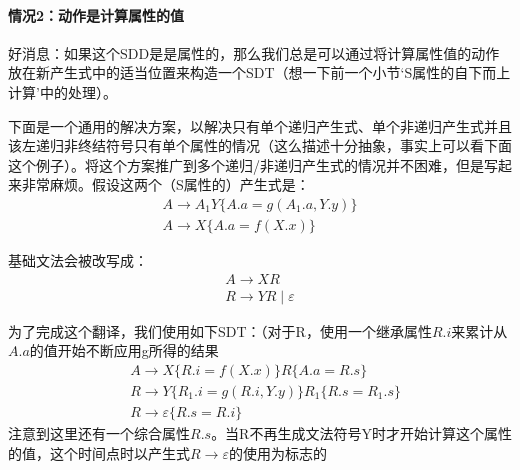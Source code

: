 \documentclass[]{report}
\begin{document}
			\paragraph{情况2：动作是计算属性的值}
			好消息：如果这个SDD是是属性的，那么我们总是可以通过将计算属性值的动作放在新产生式中的适当位置来构造一个SDT（想一下前一个小节‘S属性的自下而上计算’中的处理）。\par
			下面是一个通用的解决方案，以解决只有单个递归产生式、单个非递归产生式并且该左递归非终结符号只有单个属性的情况（这么描述十分抽象，事实上可以看下面这个例子）。将这个方案推广到多个递归/非递归产生式的情况并不困难，但是写起来非常麻烦。假设这两个（S属性的）产生式是：
			\[\begin{gathered}
				A\to A_1Y\{A.a=g(A_1.a,Y.y)\}\\
				A\to X\{A.a=f(X.x)\}
			\end{gathered}\]\par
			基础文法会被改写成：
			\[\begin{gathered}
				A\to XR\\
				R\to YR\mid\varepsilon
			\end{gathered}\]\par
			为了完成这个翻译，我们使用如下SDT：（对于R，使用一个继承属性$R.i$来累计从$A.a$的值开始不断应用g所得的结果
			\[\begin{aligned}
				&A\to X\{R.i=f(X.x)\}R\{A.a=R.s\}\\
				&R\to Y\{R_1.i=g(R.i,Y.y)\}R_1\{R.s=R_1.s\}\\
				&R\to\varepsilon\{R.s=R.i\}
			\end{aligned}\]
			注意到这里还有一个综合属性$R.s$。当R不再生成文法符号Y时才开始计算这个属性的值，这个时间点时以产生式$R\to\varepsilon$的使用为标志的
\end{document}
